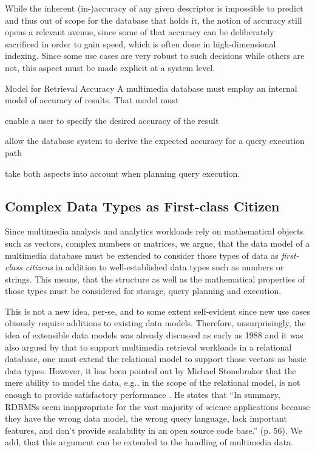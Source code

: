 While the inherent (in-)accuracy of any given descriptor is impossible to predict and thus out of scope for the database that holds it, the notion of accuracy still opens a relevant avenue, since some of that accuracy can be deliberately sacrificed in order to gain speed, which is often done in high-dimensional indexing. Since some use cases are very robust to such decisions while others are not, this aspect must be made explicit at a system level.

\begin{requirement}[label=requirement:accuracy_model]{Model for Retrieval Accuracy}{}
    A multimedia database must employ an internal model of accuracy of results. That model must
    \begin{enumerate*}[label=(\roman*)]
        \item enable a user to specify the desired accuracy of the result
        \item allow the database system to derive the expected accuracy for a query execution path
        \item take both aspects into account when planning query execution.
    \end{enumerate*}
\end{requirement}

\subsection{Complex Data Types as First-class Citizen}
Since multimedia analysis and analytics workloads rely on mathematical objects such as vectors, complex numbers or matrices, we argue, that the data model of a multimedia database must be extended to consider those types of data as \emph{first-class citizens} in addition to well-established data types such as numbers or strings. This means, that the structure as well as the mathematical properties of those types must be considered for storage, query planning and execution.

This is not a new idea, per-se, and to some extent self-evident since new use cases obiously require additions to existing data models. Therefore, unsurprisingly, the idea of extensible data models was already discussed as early as 1988 \cite{Linnemann:1988Design} and it was also argued by \cite{Giangreco:2018Database} that to support multimedia retrieval workloads in a relational database, one must extend the relational model to support those vectors as basic data types. However, it has been pointed out by Michael Stonebraker that the mere ability to model the data, e.g., in the scope of the relational model, is not enough to provide satisfactory performance \cite{Stonebraker:2013SciDB}. He states that ``In summary, RDBMSs seem inappropriate for the vast majority of science applications because they have the wrong data model, the wrong query language, lack important features, and don't provide scalability in an open source code base.'' \cite{Stonebraker:2013SciDB} (p. 56). We add, that this argument can be extended to the handling of multimedia data.

